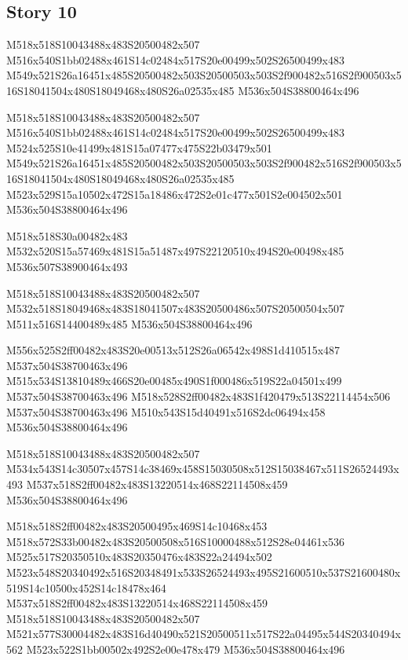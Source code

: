 \documentclass{article}
\begin{document}
\subsection{Story 10}

\begin{multicols}{5}
\begin{center}

M518x518S10043488x483S20500482x507 %
M516x540S1bb02488x461S14c02484x517S20e00499x502S26500499x483 %
M549x521S26a16451x485S20500482x503S20500503x503S2f900482x516S2f900503x516S18041504x480S18049468x480S26a02535x485 %
M536x504S38800464x496 %

M518x518S10043488x483S20500482x507 %
M516x540S1bb02488x461S14c02484x517S20e00499x502S26500499x483 %
M524x525S10e41499x481S15a07477x475S22b03479x501 %
M549x521S26a16451x485S20500482x503S20500503x503S2f900482x516S2f900503x516S18041504x480S18049468x480S26a02535x485 %
M523x529S15a10502x472S15a18486x472S2e01c477x501S2e004502x501 %
M536x504S38800464x496 %

M518x518S30a00482x483 %
M532x520S15a57469x481S15a51487x497S22120510x494S20e00498x485 %
M536x507S38900464x493 %

M518x518S10043488x483S20500482x507 %
M532x518S18049468x483S18041507x483S20500486x507S20500504x507 %
M511x516S14400489x485 %
M536x504S38800464x496 %

M556x525S2ff00482x483S20e00513x512S26a06542x498S1d410515x487 %
M537x504S38700463x496 %
M515x534S13810489x466S20e00485x490S1f000486x519S22a04501x499 %
M537x504S38700463x496 %
M518x528S2ff00482x483S1f420479x513S22114454x506 %
M537x504S38700463x496 %
M510x543S15d40491x516S2dc06494x458 %
M536x504S38800464x496 %

M518x518S10043488x483S20500482x507 %
M534x543S14c30507x457S14c38469x458S15030508x512S15038467x511S26524493x493 %
M537x518S2ff00482x483S13220514x468S22114508x459 %
M536x504S38800464x496 %

M518x518S2ff00482x483S20500495x469S14c10468x453 %
M518x572S33b00482x483S20500508x516S10000488x512S28e04461x536 %
M525x517S20350510x483S20350476x483S22a24494x502 %
M523x548S20340492x516S20348491x533S26524493x495S21600510x537S21600480x519S14c10500x452S14c18478x464 %
M537x518S2ff00482x483S13220514x468S22114508x459 %
M518x518S10043488x483S20500482x507 %
M521x577S30004482x483S16d40490x521S20500511x517S22a04495x544S20340494x562 %
M523x522S1bb00502x492S2e00e478x479 %
M536x504S38800464x496 %


\end{center}
\end{multicols}
\end{document}
